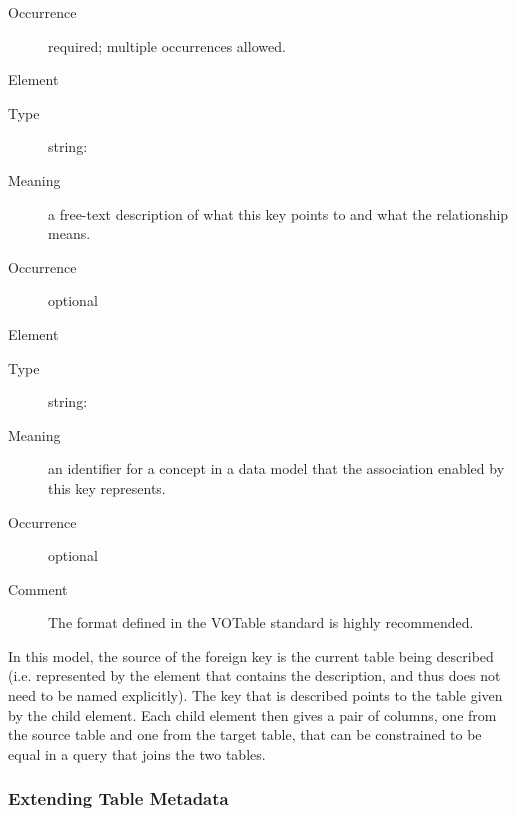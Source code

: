 \documentclass[11pt,a4paper]{ivoa}
\begin{document}
\begin{generated}
\begin{bigdescription}
\begin{description}
\item[Occurrence] required; multiple occurrences allowed.

\end{description}
\item[Element \xmlel{description}]
\begin{description}
\item[Type] string: 
\item[Meaning] 
                  a free-text description of what this key points to
                  and what the relationship means.  
               
\item[Occurrence] optional

\end{description}
\item[Element \xmlel{utype}]
\begin{description}
\item[Type] string: 
\item[Meaning] 
                  an identifier for a concept in a data model that
                  the association enabled by this key represents.  
               
\item[Occurrence] optional
\item[Comment] 
                  The format defined in the VOTable standard is highly
                  recommended. 
               

\end{description}


\end{bigdescription}\endgroup

\endgroup
\end{generated}



In this model, the source of the foreign
key is the current table being described (i.e. represented by the
 element that contains the
 description, and thus does not need to be
named explicitly).  The key that is described points to the table
given by the  child element.  Each child
 element then gives a pair of columns, one
from the source table and one from the target table, that can be
constrained to be equal in a query that joins the two tables.  






\subsubsection{Extending Table Metadata}
\label{sect:tblext}
\end{document}

